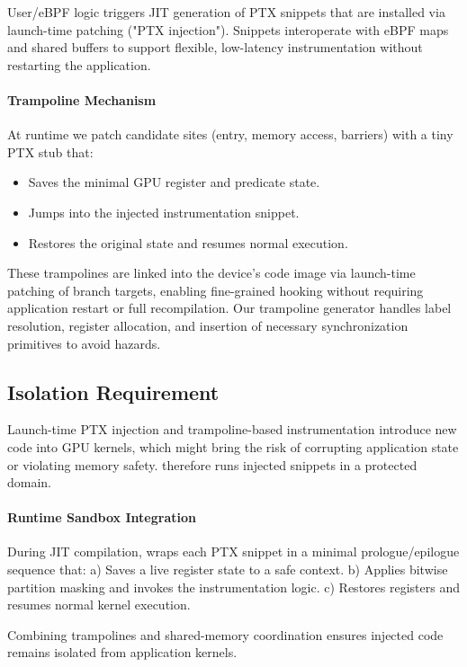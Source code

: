 User/eBPF logic triggers JIT generation of PTX snippets that are installed via launch-time patching ("PTX injection"). Snippets interoperate with eBPF maps and shared buffers to support flexible, low-latency instrumentation without restarting the application.

\paragraph{Trampoline Mechanism}
At runtime we patch candidate sites (entry, memory access, barriers) with a tiny PTX stub that:
\begin{itemize}[leftmargin=*,itemsep=0pt]
  \item Saves the minimal GPU register and predicate state.
  \item Jumps into the injected instrumentation snippet.
  \item Restores the original state and resumes normal execution.
\end{itemize}
These trampolines are linked into the device's code image via launch-time patching of branch targets, enabling fine-grained hooking without requiring application restart or full recompilation. Our trampoline generator handles label resolution, register allocation, and insertion of necessary synchronization primitives to avoid hazards.



\subsection{Isolation Requirement}\label{sec:isolation}

Launch-time PTX injection and trampoline-based instrumentation introduce new code into GPU kernels, which might bring the risk of corrupting application state or violating memory safety. \sys therefore runs injected snippets in a protected domain.

\paragraph{Runtime Sandbox Integration}
During JIT compilation, \sys{} wraps each PTX snippet in a minimal prologue/epilogue sequence that:
  a) Saves a live register state to a safe context.
  b) Applies bitwise partition masking and invokes the instrumentation logic.
  c) Restores registers and resumes normal kernel execution.

Combining trampolines and shared-memory coordination ensures injected code remains isolated from application kernels.
